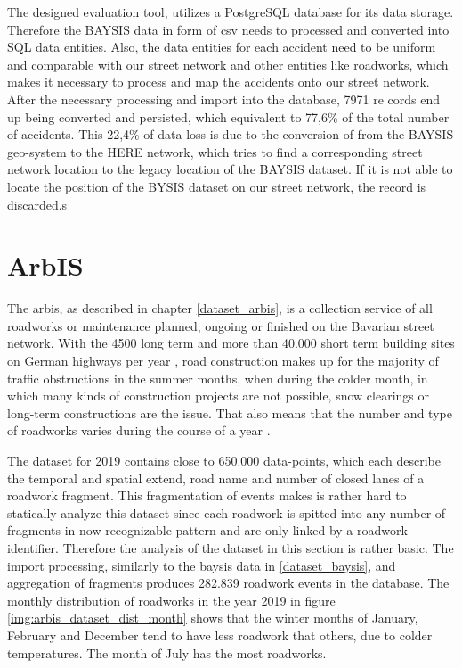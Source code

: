 The designed evaluation tool, utilizes a PostgreSQL database for its data storage. Therefore the BAYSIS data in form of \acrfull{csv} needs to processed and converted into SQL data entities. Also, the data entities for each accident need to be uniform and comparable with our street network and other entities like roadworks, which makes it necessary to process and map the accidents onto our street network. After the necessary processing and import into the database, 7971 re cords end up being converted and persisted, which equivalent to 77,6\% of the total number of accidents. This 22,4\% of data loss is due to the conversion of from the BAYSIS geo-system to the HERE network, which tries to find a corresponding street network location to the legacy location of the BAYSIS dataset. If it is not able to locate the position of the BYSIS dataset on our street network, the record is discarded.s

\section{ArbIS}
\label{dataset_arbis}

The \acrfull{arbis}, as described in chapter \autoref{dataset_arbis}, is a collection service of all roadworks or maintenance planned, ongoing or finished on the Bavarian street network. With the 4500 long term and more than 40.000 short term building sites on German highways per year \parencite{LAPID2018,Stmi2020}, road construction makes up for the majority of traffic obstructions in the summer months, when during the colder month, in which many kinds of construction projects are not possible, snow clearings or long-term constructions are the issue. That also means that the number and type of roadworks varies during the course of a year \parencite{Stmi2020}.

The dataset for 2019 contains close to 650.000 data-points, which each describe the temporal and spatial extend, road name and number of closed lanes of a roadwork fragment. This fragmentation of events makes is rather hard to statically analyze this dataset since each roadwork is spitted into any number of fragments in now recognizable pattern and are only linked by a roadwork identifier. Therefore the analysis of the dataset in this section is rather basic. The import processing, similarly to the \acrshort{baysis} data in \autoref{dataset_baysis}, and aggregation of fragments produces 282.839 roadwork events in the database. The monthly distribution of roadworks in the year 2019 in figure \autoref{img:arbis_dataset_dist_month} shows that the winter months of January, February and December tend to have less roadwork that others, due to colder temperatures. The month of July has the most roadworks.

